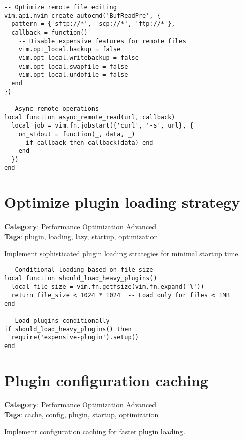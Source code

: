 {{{{{{{{{\begin{Exa*}{}
\begin{Verbatim}[fontsize=\footnotesize, breaklines, breakanywhere]
-- Optimize remote file editing
vim.api.nvim_create_autocmd('BufReadPre', {
  pattern = {'sftp://*', 'scp://*', 'ftp://*'},
  callback = function()
    -- Disable expensive features for remote files
    vim.opt_local.backup = false
    vim.opt_local.writebackup = false
    vim.opt_local.swapfile = false
    vim.opt_local.undofile = false
  end
})

-- Async remote operations
local function async_remote_read(url, callback)
  local job = vim.fn.jobstart({'curl', '-s', url}, {
    on_stdout = function(_, data, _)
      if callback then callback(data) end
    end
  })
end
\end{Verbatim}
\end{Exa*}

\section{Optimize plugin loading strategy}

\textbf{Category}: Performance Optimization Advanced\\ \textbf{Tags}: plugin, loading, lazy, startup, optimization
\vspace{0.5cm}

Implement sophisticated plugin loading strategies for minimal startup time.

\begin{Exa*}{}
\begin{Verbatim}[fontsize=\footnotesize, breaklines, breakanywhere]
-- Conditional loading based on file size
local function should_load_heavy_plugins()
  local file_size = vim.fn.getfsize(vim.fn.expand('%'))
  return file_size < 1024 * 1024  -- Load only for files < 1MB
end

-- Load plugins conditionally
if should_load_heavy_plugins() then
  require('expensive-plugin').setup()
end
\end{Verbatim}
\end{Exa*}

\section{Plugin configuration caching}

\textbf{Category}: Performance Optimization Advanced\\ \textbf{Tags}: cache, config, plugin, startup, optimization
\vspace{0.5cm}

Implement configuration caching for faster plugin loading.

}}}}}}}}}
